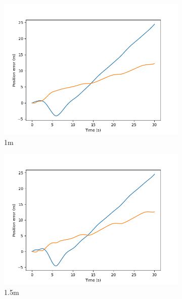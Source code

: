 \documentclass[class=article, crop=false]{standalone}
\begin{document}
\begin{figure}
\begin{subfigure}[b]{0.48\textwidth}
        \includegraphics{scenario1/rov-100m/1.0m/usv_pos_error_uncontrolled}
        \caption{1m}
        \label{}
    \end{subfigure}
    \hfill
        \begin{subfigure}[b]{0.48\textwidth}
        \centering
        \includegraphics{scenario1/rov-100m/1.5m/usv_pos_error_uncontrolled}
        \caption{1.5m}
        \label{}
    \end{subfigure}
    \vfill
        \begin{subfigure}[b]{0.48\textwidth}
        \centering

\end{subfigure}
\end{figure}
\end{document}

